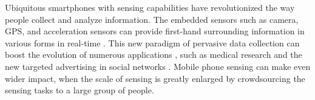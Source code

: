 \documentclass{IEEEtran}
\begin{document}


Ubiquitous smartphones with sensing capabilities have revolutionized the way people collect and analyze information. The embedded sensors such as camera, GPS, and acceleration sensors can provide first-hand surrounding information in various forms in real-time \cite{lane:survey_mobile_sensing}. This new paradigm of pervasive data collection can boost the evolution of numerous applications \cite{ganti:survey_crowdsensing,chat:crowdsourcing_smartphones,Mun09peir,Rachuri:2010,Kim:2011}, such as medical research \cite{Rachuri:2010} and the new targeted advertising in social networks \cite{Kim:2011}. %
Mobile phone sensing can make even wider impact, when the scale of sensing is greatly enlarged by crowdsourcing the sensing tasks to a large group of people.
\end{document}
